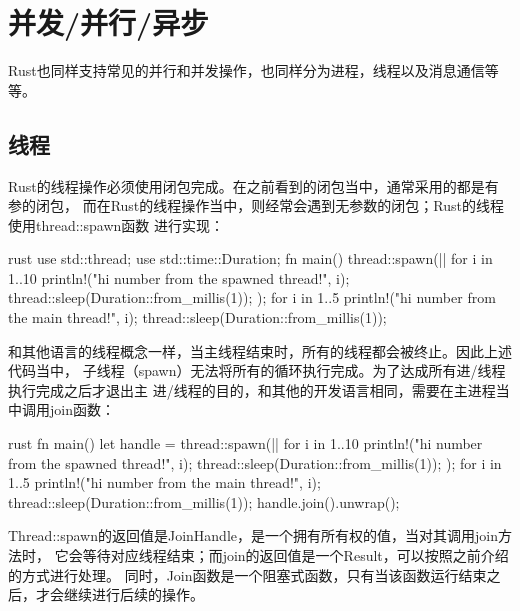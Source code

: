 \section{并发/并行/异步}
Rust也同样支持常见的并行和并发操作，也同样分为进程，线程以及消息通信等等。

\subsection{线程}
Rust的线程操作必须使用闭包完成。在之前看到的闭包当中，通常采用的都是有参的闭包，
而在Rust的线程操作当中，则经常会遇到无参数的闭包；Rust的线程使用thread::spawn函数
进行实现：
\begin{code-block}{rust}
use std::thread;
use std::time::Duration;
fn main() {
    thread::spawn(|| {
        for i in 1..10 {
            println!("hi number {} from the spawned thread!", i);
            thread::sleep(Duration::from_millis(1));
        }
    });
    for i in 1..5 {
        println!("hi number {} from the main thread!", i);
        thread::sleep(Duration::from_millis(1));
    }
}
\end{code-block}
和其他语言的线程概念一样，当主线程结束时，所有的线程都会被终止。因此上述代码当中，
子线程（spawn）无法将所有的循环执行完成。为了达成所有进/线程执行完成之后才退出主
进/线程的目的，和其他的开发语言相同，需要在主进程当中调用join函数：
\begin{code-block}{rust}
fn main() {
    let handle = thread::spawn(|| {
        for i in 1..10 {
            println!("hi number {} from the spawned thread!", i);
            thread::sleep(Duration::from_millis(1));
        }
    });
    for i in 1..5 {
        println!("hi number {} from the main thread!", i);
        thread::sleep(Duration::from_millis(1));
    }
    handle.join().unwrap();
}
\end{code-block}
Thread::spawn的返回值是JoinHandle，是一个拥有所有权的值，当对其调用join方法时，
它会等待对应线程结束；而join的返回值是一个Result，可以按照之前介绍的方式进行处理。
同时，Join函数是一个阻塞式函数，只有当该函数运行结束之后，才会继续进行后续的操作。

